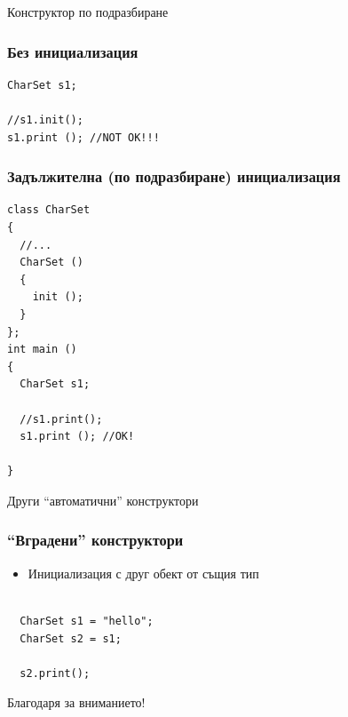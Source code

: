 \documentclass{beamer}
\begin{document}
\begin{frame}
\centerline{Конструктор по подразбиране}
\end{frame}


\begin{frame}[fragile]
\frametitle{Без инициализация}


\begin{flushleft}
\begin{lstlisting}
CharSet s1;

//s1.init();
s1.print (); //NOT OK!!!

\end{lstlisting}  
\end{flushleft}
\end{frame}

\begin{frame}[fragile]
\frametitle{Задължителна (по подразбиране) инициализация}


\begin{flushleft}
\begin{lstlisting}
class CharSet
{
  //...
  CharSet ()
  {
    init ();
  }
};
int main ()
{
  CharSet s1;

  //s1.print();
  s1.print (); //OK!

}
\end{lstlisting}  
\end{flushleft}
\end{frame}


\begin{frame}
\centerline{Други ``автоматични'' конструктори}
\end{frame}


\begin{frame}[fragile]
\frametitle{``Вградени'' конструктори}

\begin{itemize}
  \item Инициализация с друг обект от същия тип 
\end{itemize}

\begin{flushleft}
\begin{lstlisting}

  CharSet s1 = "hello";
  CharSet s2 = s1; 

  s2.print();

\end{lstlisting}  
\end{flushleft}

\end{frame}

\begin{frame}
\centerline{Благодаря за вниманието!}
\end{frame}
\end{document}
